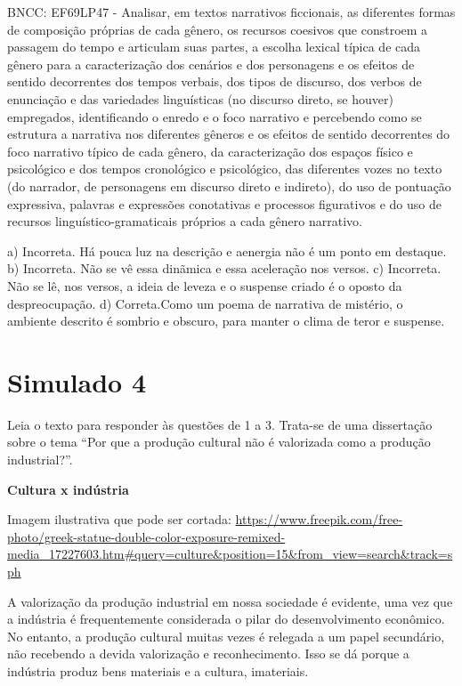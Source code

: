\begin{itemize}
\begin{itemize}
{\begin{itemize}
\begin{itemize}
\begin{escolha}
\begin{escolha}
\begin{escolha}
\begin{escolha}
\begin{escolha}
\begin{escolha}
\begin{escolha}
\begin{escolha}
BNCC: EF69LP47 - Analisar, em textos narrativos ficcionais, as
diferentes formas de composição próprias de cada gênero, os recursos
coesivos que constroem a passagem do tempo e articulam suas partes, a
escolha lexical típica de cada gênero para a caracterização dos cenários
e dos personagens e os efeitos de sentido decorrentes dos tempos
verbais, dos tipos de discurso, dos verbos de enunciação e das
variedades linguísticas (no discurso direto, se houver) empregados,
identificando o enredo e o foco narrativo e percebendo como se estrutura
a narrativa nos diferentes gêneros e os efeitos de sentido decorrentes
do foco narrativo típico de cada gênero, da caracterização dos espaços
físico e psicológico e dos tempos cronológico e psicológico, das
diferentes vozes no texto (do narrador, de personagens em discurso
direto e indireto), do uso de pontuação expressiva, palavras e
expressões conotativas e processos figurativos e do uso de recursos
linguístico-gramaticais próprios a cada gênero narrativo.

a) Incorreta. Há pouca luz na descrição e aenergia não é um ponto em
destaque. b) Incorreta. Não se vê essa dinãmica e essa aceleração nos
versos. c) Incorreta. Não se lê, nos versos, a ideia de leveza e o
suspense criado é o oposto da despreocupação. d) Correta.Como um poema
de narrativa de mistério, o ambiente descrito é sombrio e obscuro, para
manter o clima de teror e suspense.

\chapter{Simulado 4}

Leia o texto para responder às questões de 1 a 3. Trata-se de uma
dissertação sobre o tema ``Por que a produção cultural não é valorizada
como a produção industrial?''.

\textbf{Cultura x indústria}

Imagem ilustrativa que pode ser cortada:
\url{https://www.freepik.com/free-photo/greek-statue-double-color-exposure-remixed-media_17227603.htm\#query=culture\&position=15\&from_view=search\&track=sph}

A valorização da produção industrial em nossa sociedade é evidente, uma
vez que a indústria é frequentemente considerada o pilar do
desenvolvimento econômico. No entanto, a produção cultural muitas vezes
é relegada a um papel secundário, não recebendo a devida valorização e
reconhecimento. Isso se dá porque a indústria produz bens materiais e a
cultura, imateriais.


\end{escolha}
\end{escolha}
\end{escolha}
\end{escolha}
\end{escolha}
\end{escolha}
\end{escolha}
\end{escolha}
\end{itemize}
\end{itemize}}
\end{itemize}
\end{itemize}
